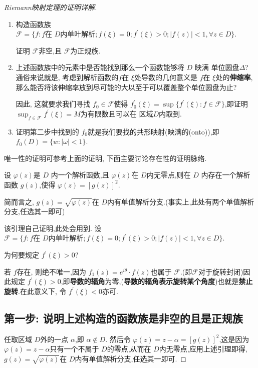\begin{proof}[Riemann映射定理的证明详解]
    \begin{remark}[思路点拨]
        \begin{enumerate}[label=Step.\Roman*]
            \item 构造函数族 $\mathscr{F}=\{f\colon f\text{在 $D$内单叶解析};  f(\xi)=0; f^\prime (\xi)>0; |f(z)|<1, \forall z\in D\}$.

            证明 $\mathscr{F}$非空,且 $\mathscr{F}$为正规族.
            \item 上述函数族中的元素中是否能找到那么一个函数能够将 $D$ 映满 单位圆盘$\Delta$? 通俗来说就是, 考虑到解析函数的$f$在 $\xi$处导数的几何意义是 $f$在 $\xi$处的\textbf{伸缩率},那么能否将该伸缩率放到尽可能的大以至于可以覆盖整个单位圆盘为止?

            因此, 这就要求我们寻找 $f_0\in\mathscr{F}$使得 $f_0^\prime(\xi)=\sup\{f^\prime(\xi)\colon f\in\mathscr{F}\}$,即证明 $\sup_{f\in\mathscr{F}}f^\prime (\xi)=M$为有限数且可以在 区域$D$内取到.
            \item 证明第二步中找到的 $f_0$就是我们要找的共形映射(映满的(onto)),即 $f_0(D)=\{w\colon |\omega|<1\}$.
        \end{enumerate}
    \end{remark}
    唯一性的证明可参考上面的证明, 下面主要讨论存在性的证明脉络.

    \begin{lem}
        设 $\varphi(z)$是 $D$ 内一个解析函数,且 $\varphi(z)$在 $D$内无零点,则在 $D$ 内存在一个解析函数 $g(z)$,使得 $\varphi(z)=[g(z)]^2$.

        简而言之, $g(z)=\sqrt{\varphi(z)}$在 $D$内有单值解析分支.(事实上,此处有两个单值解析分支,任选其一即可)
    \end{lem}
    该引理自己证明,此处会用到.
    设$\mathscr{F}=\{f\colon f\text{在 $D$内单叶解析};  f(\xi)=0; f^\prime (\xi)>0; |f(z)|<1, \forall z\in D\}$.
    \begin{remark}[释疑解惑 I]
        为何要规定 $f^\prime(\xi)>0$?

        若 $f$存在, 则绝不唯一,因为 $f_1(z)=e^{i\theta}\cdot f(z)$也属于 $\mathscr{F}$.(即$\mathscr{F}$对于旋转封闭)因此规定 $f^\prime(\xi)>0$,即\textbf{导数的辐角}为零,(\textbf{导数的辐角表示旋转某个角度})也就是\textbf{禁止旋转}.在此意义下, 令 $f^\prime(\xi)<0$亦可.
    \end{remark}
\subsection{第一步: 说明上述构造的函数族是非空的且是正规族}\label{subsec:setp1}
        任取区域 $D$外的一点 $\alpha$,即 $\alpha\not\in D$. 然后令 $\varphi(z)=z-\alpha=[g(z)]^2$,这是因为 $\varphi(z)=z-\alpha$只有一个不属于 $D$的零点,从而在 $D$内无零点,应用上述引理即得, $g(z)=\sqrt{\varphi(z)}$在 $D$内有单值解析分支,任选其一即可.


\end{proof}
